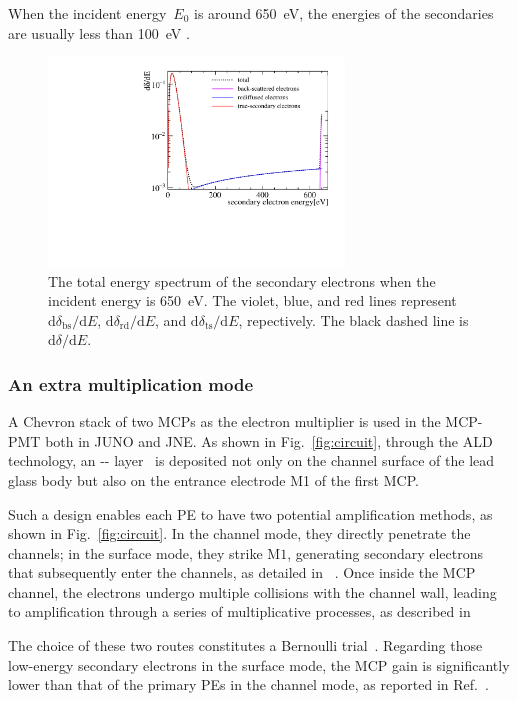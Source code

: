 When the incident energy~$E_0$ is around \SI{650}{eV}, the energies of the secondaries are usually less than \SI{100}{eV} .
\begin{figure}[h]
	\centering
	\includegraphics[width=0.7\textwidth]{PMTRelated/GTmodel/SES.pdf}
	\caption{The total energy spectrum of the secondary electrons when the incident energy is \SI{650}{eV}.
		The violet, blue, and red lines represent $\mathrm{d}\delta_{\mathrm{bs}}/\mathrm{d}E$, $\mathrm{d}\delta_{\mathrm{rd}}/\mathrm{d}E$, and
		$\mathrm{d}\delta_{\mathrm{ts}}/\mathrm{d}E$, repectively.
		The black dashed line is $\mathrm{d}\delta/\mathrm{d}E$.}
	\label{fig:SES}
\end{figure}

\subsubsection{An extra multiplication mode}
A Chevron stack of two MCPs as the electron multiplier is used in the MCP-PMT both in JUNO and JNE.
As shown in Fig.~\ref{fig:circuit}, through the ALD technology, an -- layer~\cite{zzj2021Al} is deposited not only on the channel surface of the lead glass body
but also on the entrance electrode M1 of the first MCP.

Such a design enables each PE to have two potential amplification methods, as shown in Fig.~\ref{fig:circuit}.
In the channel mode, they directly penetrate the channels; in the surface mode, they strike $\mathrm{M}1$, generating secondary electrons that subsequently enter the channels, as detailed in ~\cite{2016Optimization}. Once inside the MCP channel, the electrons undergo multiple collisions with the channel wall, leading to amplification through a series of multiplicative processes, as described in~\cite{1955Scintillation}

The choice of these two routes constitutes a Bernoulli trial~\cite{1955Scintillation}. Regarding those low-energy secondary electrons in the surface mode, the MCP gain is significantly lower than that of the primary PEs in the channel mode, as reported in Ref.~\cite{2012An}.

